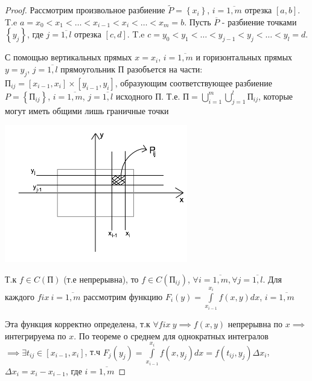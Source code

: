 \documentclass[../../main.tex]{subfiles}
\begin{document}
\begin{proof}
	Рассмотрим произвольное разбиение $ \widetilde{P} = 
	\left\lbrace x_i \right\rbrace  $, $i = \overline{1,m} $ 
	отрезка $ \left[ a, b\right]  $. T.e $a = x_0 < x_1 < \dots 
	< x_{i-1} < x_i < \dots < x_m = b $. Пусть $ \overline{P} $
	 - разбиение точками $ \left\lbrace y_j \right\rbrace  $, 
	 где $j = \overline{1, l} $ отрезка $ \left[ c, d\right]  $. 
	 T.e $c = y_0 < y_1 < \dots < y_{j-1} < y_j < \dots < y_l = d $.
	 
	 С помощью вертикальных прямых $ x = x_i $, $ i = \overline{1, m} $
	 и горизонтальных прямых $ y = y_j $, $ j = \overline{1, l} $
	 прямоугольник $ \text{П} $ разобъется на части: $ \text{П}_{ij} = 
	 \left[ x_{i - 1}, x_i \right] \times \left[ y_{i - 1}, y_i \right] $, 
	 образующим соответствующее разбиение 
	 $ P = \left\lbrace \text{П}_{ij} \right\rbrace $,
	 $ i = \overline{1, m} $, $ j = \overline{1, l} $ 
	 исходного $ \text{П} $. Т.е. $ \text{П} = 
	 \bigcup\limits_{i = 1}^m \bigcup\limits_{j = 1}^l \text{П}_{ij}$, 
	 которые могут иметь общими лишь граничные точки
	 
	 \begin{center}
	 	\includegraphics[width=0.6\textwidth]{lec13_rectangle.png}
	 \end{center}
 
 	Т.к $ f \in C( \text{П} )$ (т.е непрерывна), то $ f \in C( \text{П}_{ij} )$,
 	$ \forall i = \overline{1, m} , \forall j = \overline{1, l}$. Для каждого 
 	$ fix\ i = \overline{1, m} $ рассмотрим функцию $ F_i \left( y \right) = 
 	\int\limits_{ x_{i - 1} } ^ {x_i} f \left( x, y \right) dx $, 
 	$ i = \overline{1, m} $
 	
 	Эта функция корректно определена, 
 	т.к $ \forall fix\ y \implies f \left( x, y\right) $
 	непрерывна по $ x \implies $ интегрируема по $ x $. По теореме о среднем
 	для однократных интегралов $ \implies \exists t_{ij} \in 
 	\left[ x_{i - 1}, x_i \right] $, т.ч $ F_j \left( y_j \right) = 
 	\int\limits_{x_{i - 1} } ^ {x_i} f \left( x, y_j \right) dx = 
 	f \left(  t_{ij}, y_j \right) \Delta x_i$, 
 	$ \Delta x_i = x_i - x_{i - 1}$, где 
 	$ i = \overline{1, m} $
 	

\end{proof}
\end{document}
